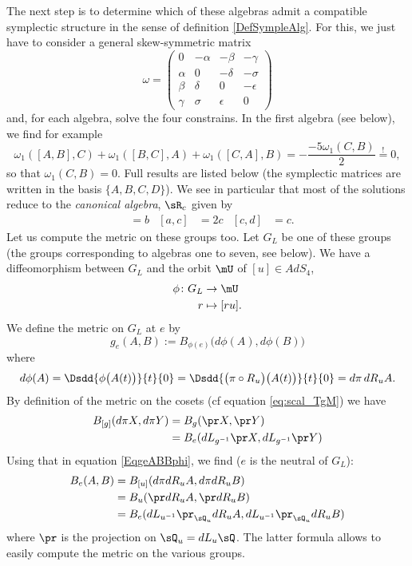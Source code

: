  The next step is to determine which of these algebras admit a compatible symplectic structure in the sense of definition \ref{DefSympleAlg}. 
 For this, we just have to consider a general skew-symmetric matrix
\[
  \omega=
\begin{pmatrix}
0&-\alpha&-\beta&-\gamma\\
\alpha&0&-\delta&-\sigma\\
\beta&\delta&0&-\epsilon\\
\gamma&\sigma&\epsilon&0
\end{pmatrix}
\]
 and, for each algebra, solve the four constrains. In the first algebra (see below), we find for example
\[
  \omega_{1}([A,B],C)+\omega_{1}([B,C],A)+\omega_{1}([C,A],B)=-\frac{ -5\omega_{1}(C,B) }{ 2 }\stackrel{!}{=}0,
\]
so that $\omega_{1}(C,B)=0$. Full results are listed below (the symplectic matrices are written in the basis $\{ A,B,C,D \}$).  We see in particular that most of the solutions reduce to the \emph{canonical algebra}, $\sR_c$ given by
\begin{align*}  
[a,b]&=b
&[a,c]&=2c
&[c,d]&=c.
\end{align*}
Let us compute the metric on these groups too. Let $G_{L}$ be one of these groups (the groups corresponding to algebras one to seven, see below). We have a diffeomorphism between $G_{L}$ and the orbit $\mU$ of $[u]\in AdS_4$,
\begin{equation}
\begin{aligned}
 \phi\colon G_{L}&\to \mU \\
r&\mapsto [ru].
\end{aligned}
\end{equation}
We define the metric on $G_{L}$ at $e$ by
\begin{equation}   \label{EqgeABBphi}
  g_{e}(A,B):=B_{\phi(e)}\big( d\phi(A),d\phi(B) \big)
\end{equation}
where
\[
  d\phi(A)=\Dsdd{ \phi\big( A(t) \big) }{t}{0}=\Dsdd{ \big( \pi\circ R_{u} \big)\big( A(t) \big) }{t}{0}=d\pi\,dR_{u}A.
\]
By definition of the metric on the cosets (cf equation \eqref{eq:scal_TgM}) we have
\begin{align*}
B_{[g]}(d\pi X,d\pi Y)&=B_{g}(\pr X,\pr Y)\\
		&=B_{e}(dL_{g^{-1}}\pr X,dL_{g^{-1}}\pr Y)
\end{align*}
Using that in equation \eqref{EqgeABBphi}, we find ($e$ is the neutral of $G_{L}$):
 \[
\begin{split}
  B_{e}(A,B)&=B_{[u]}(d\pi dR_{u}A,d\pi dR_{u}B)\\
		&=B_{u}(\pr dR_{u}A,\pr dR_{u}B)\\
		&=B_{e}(dL_{u^{-1}}\pr_{\sQ_{u}}dR_{u}A,dL_{u^{-1}}\pr_{\sQ_{u}}dR_{u}B)
\end{split}
\]
where $\pr$ is the projection on $\sQ_{u}=dL_{u}\sQ$. The latter formula allows to easily compute the metric on the various groups.

